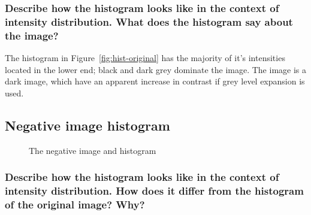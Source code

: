 \documentclass[article, 1.5space, letterpaper, 12pt, oneside, header, footer]{SydeClass}
\begin{document}
\subsubsection{Describe how the histogram looks like in the context of intensity distribution. What does the histogram say about the image?}

The histogram in Figure~\ref{fig:hist-original} has the majority of it's intensities located in the lower end; black and dark grey dominate the image. The image is a dark image, which have an apparent increase in contrast if grey level expansion is used.

\subsection{Negative image histogram}

\begin{figure}[ht]
\centering
	\caption{The negative image and histogram}
	\label{fig:hist-neg}
\end{figure}

\subsubsection{Describe how the histogram looks like in the context of intensity distribution. How does it differ from
the histogram of the original image? Why?}
\end{document}
